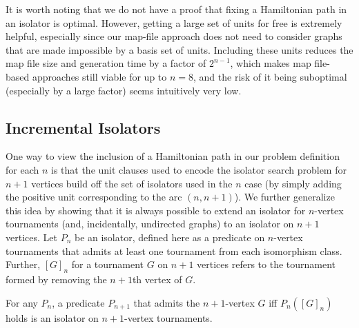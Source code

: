 \documentclass[a4paper,UKenglish,cleveref, autoref, thm-restate]{lipics-v2021}
\begin{document}
It is worth noting that we do not have a proof that fixing a Hamiltonian path in an isolator is optimal.  However, getting a large set of units for free is extremely helpful, especially since our map-file approach does not need to consider graphs that are made impossible by a basis set of units. Including these units reduces the map file size and generation time by a factor of $2^{n-1}$, which makes map file-based approaches still viable for up to $n = 8$, and the risk of it being suboptimal (especially by a large factor) seems intuitively very low.


\subsection{Incremental Isolators}
One way to view the inclusion of a Hamiltonian path in our problem definition for each $n$ is that the unit clauses used to encode the isolator search problem for $n+1$ vertices build off the set of isolators used in the $n$ case (by simply adding the positive unit corresponding to the arc $(n, n+1)$). We further generalize this idea by showing that it is always possible to extend an isolator for $n$-vertex tournaments (and, incidentally, undirected graphs) to an isolator on $n+1$ vertices. Let $P_n$ be an isolator, defined here as a predicate on $n$-vertex tournaments that admits at least one tournament from each isomorphism class. Further, $[G]_n$ for a tournament $G$ on $n+1$ vertices refers to the tournament formed by removing the $n+1$th vertex of $G$.

\begin{theorem}
 For any $P_n$, a predicate $P_{n+1}$ that admits the $n+1$-vertex $G$ iff $P_n([G]_n)$ holds is an isolator on $n+1$-vertex tournaments.
\end{theorem}
\end{document}
